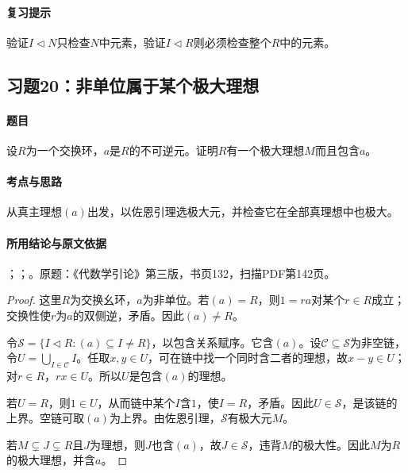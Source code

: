 \paragraph{复习提示}

验证$I\lhd N$只检查$N$中元素，验证$I\lhd R$则必须检查整个$R$中的元素。



\subsection{习题20：非单位属于某个极大理想}

\label{ex:3:20}

\paragraph{题目}

设$R$为一个交换环，$a$是$R$的不可逆元。证明$R$有一个极大理想$M$而且包含$a$。

\paragraph{考点与思路}

从真主理想$(a)$出发，以佐恩引理选极大元，并检查它在全部真理想中也极大。

\paragraph{所用结论与原文依据}

；；。原题：《代数学引论》第三版，书页132，扫描PDF第142页。


\begin{proof}

这里$R$为交换幺环，$a$为非单位。若$(a)=R$，则$1=ra$对某个$r\in R$成立；交换性使$r$为$a$的双侧逆，矛盾。因此$(a)\ne R$。

令$\mathcal S=\{I\lhd R:(a)\subseteq I\ne R\}$，以包含关系赋序。它含$(a)$。设$\mathcal C\subseteq\mathcal S$为非空链，令$U=\bigcup_{I\in\mathcal C}I$。任取$x,y\in U$，可在链中找一个同时含二者的理想，故$x-y\in U$；对$r\in R$，$rx\in U$。所以$U$是包含$(a)$的理想。

若$U=R$，则$1\in U$，从而链中某个$I$含$1$，使$I=R$，矛盾。因此$U\in\mathcal S$，是该链的上界。空链可取$(a)$为上界。由佐恩引理，$\mathcal S$有极大元$M$。

若$M\subsetneq J\subsetneq R$且$J$为理想，则$J$也含$(a)$，故$J\in\mathcal S$，违背$M$的极大性。因此$M$为$R$的极大理想，并含$a$。

\end{proof}


